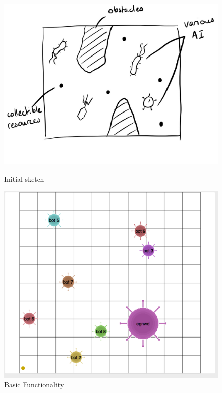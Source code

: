 \documentclass[a4paper, 6pt]{article}
\begin{document}
\quad
\begin{figure}[ht!]
\includegraphics[width=\linewidth]{game_01.jpg}
\caption{Initial sketch}
\endminipage\hfill
{}
\includegraphics[width=\linewidth]{game_02.png}
\caption{Basic Functionality}
\endminipage\hfill
{}

\end{figure}
\end{document}

